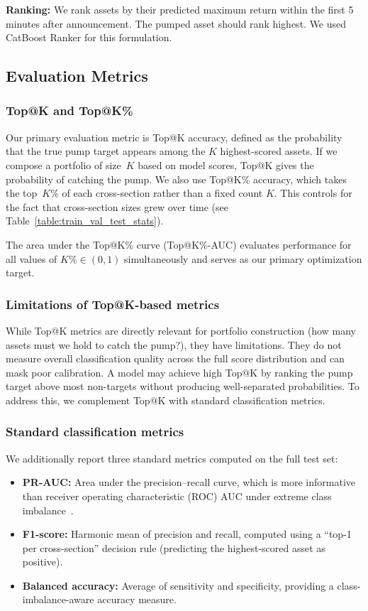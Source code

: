 \documentclass{ieeeaccess}
\begin{document}
\textbf{Ranking:} We rank assets by their predicted maximum return within the first 5 minutes after announcement. The pumped asset should rank highest. We used CatBoost Ranker for this formulation.

\subsection{Evaluation Metrics}
\label{sec:evaluation_metrics}

\subsubsection{Top@K and Top@K\%}
Our primary evaluation metric is Top@K accuracy, defined as the probability that the true pump target appears among the $K$ highest-scored assets. If we compose a portfolio of size~$K$ based on model scores, Top@K gives the probability of catching the pump. We also use Top@K\% accuracy, which takes the top~$K\%$ of each cross-section rather than a fixed count $K$. This controls for the fact that cross-section sizes grew over time (see Table~\ref{table:train_val_test_stats}).

The area under the Top@K\% curve (Top@K\%-AUC) evaluates performance for all values of $K\% \in (0,1)$ simultaneously and serves as our primary optimization target.

\subsubsection{Limitations of Top@K-based metrics}
While Top@K metrics are directly relevant for portfolio construction (how many assets must we hold to catch the pump?), they have limitations. They do not measure overall classification quality across the full score distribution and can mask poor calibration. A model may achieve high Top@K by ranking the pump target above most non-targets without producing well-separated probabilities. To address this, we complement Top@K with standard classification metrics.

\subsubsection{Standard classification metrics}
We additionally report three standard metrics computed on the full test set:
\begin{itemize}
    \item \textbf{PR-AUC:} Area under the precision--recall curve, which is more informative than receiver operating characteristic (ROC) AUC under extreme class imbalance~\cite{elkan2001cost}.
    \item \textbf{F1-score:} Harmonic mean of precision and recall, computed using a ``top-1 per cross-section'' decision rule (predicting the highest-scored asset as positive).
    \item \textbf{Balanced accuracy:} Average of sensitivity and specificity, providing a class-imbalance-aware accuracy measure.
\end{itemize}
\end{document}
